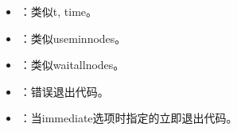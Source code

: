 \documentclass[a4paper,12pt,english]{sphinxmanual}
\begin{document}
\begin{itemize}
\item {} 
\sphinxAtStartPar
{}：类似\sphinxhyphen{}t, \sphinxhyphen{}\sphinxhyphen{}time。

\item {} 
\sphinxAtStartPar
{}：类似\sphinxhyphen{}\sphinxhyphen{}use\sphinxhyphen{}min\sphinxhyphen{}nodes。

\item {} 
\sphinxAtStartPar
{}：类似\sphinxhyphen{}\sphinxhyphen{}wait\sphinxhyphen{}all\sphinxhyphen{}nodes。

\item {} 
\sphinxAtStartPar
{}：错误退出代码。

\item {} 
\sphinxAtStartPar
{}：当\sphinxhyphen{}\sphinxhyphen{}immediate选项时指定的立即退出代码。

\end{itemize}
\end{document}
